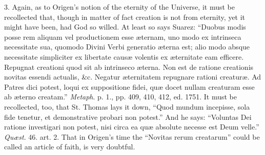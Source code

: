 3. Again, as to Origen's notion of the eternity of the Universe, it
must be recollected that, though in matter of fact creation is not
from eternity, yet it might have been, had God so willed. At least so
says Suarez: ``Duobus modis posse rem aliquam vel productionem
esse æternam, uno modo ex intrinseca necessitate sua, quomodo Divini
Verbi generatio æterna est; alio modo absque necessitate simpliciter
ex libertate causæ volentis ex æternitate eam efficere. Repugnat
creationi quod sit ab intrinseco æterna. Non est de ratione
creationis novitas essendi actualis, \&c. Negatur æternitatem
repugnare rationi creaturæ. Ad Patres dici potest, loqui ex
suppositione fidei, quæ docet nullam creaturam esse ab æterno
creatam.'' \emph{Metaph}. p. 1., pp. 409, 410, 412, ed. 1751. It
must be recollected, too, that St. Thomas lays it down, ``Quod
mundum incepisse, sola fide tenetur, et demonstrative probari non
potest.'' And he says: ``Voluntas Dei ratione investigari non
potest, nisi circa ea quæ absolute necesse est Deum velle.'' \emph{Quæst}.
46. art. 2. That in Origen's time the ``Novitas rerum creatarum''
could be called an article of faith, is very doubtful.

